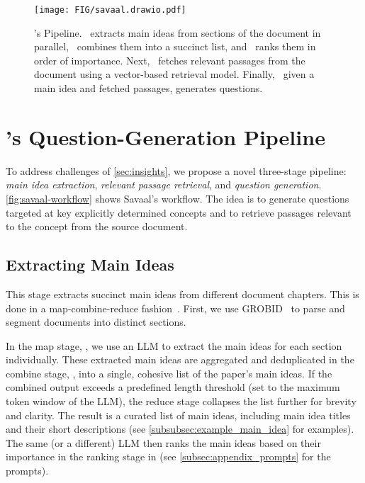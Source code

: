 \begin{figure*}[!t]
\centering
    \texttt{[image: FIG/savaal.drawio.pdf]}
    \caption{\name's Pipeline. \bluecircle\ \name extracts main ideas from sections of the document in parallel, \redcircle\ combines them into a succinct list, and \greencircle\ ranks them in order of importance. Next, \purplecircle\ \name fetches relevant passages from the document using a vector-based retrieval model. Finally, \orangecircle\ given a main idea and fetched passages, \name generates questions.}
    \label{fig:savaal-workflow}
\vspace{-10 pt}
\end{figure*}

\section{\name's Question-Generation Pipeline}
\label{sec:pipeline}


To address challenges of \autoref{sec:insights}, we propose a novel three-stage pipeline: \emph{main idea extraction}, \emph{relevant passage retrieval}, and \emph{question generation}. \autoref{fig:savaal-workflow} shows Savaal's workflow. The idea is to generate questions targeted at key explicitly determined concepts and to retrieve passages relevant to the concept from the source document.


\subsection{Extracting Main Ideas}
\label{sec:pipeline-main-idea}
This stage extracts succinct main ideas from different document chapters. This is done in a map-combine-reduce fashion~\cite{langchain_mapreduce}. First, we use GROBID~\citep{GROBID} to parse and segment documents into distinct sections.


In the map stage, , we use an LLM to extract the main ideas for each section individually. These extracted main ideas are aggregated and deduplicated in the combine stage, , into a single, cohesive list of the paper’s main ideas. If the combined output exceeds a predefined length threshold (set to the maximum token window of the LLM), the reduce stage collapses the list further for brevity and clarity. The result is a curated list of main ideas, including main idea titles and their short descriptions (see \autoref{subsubsec:example_main_idea} for examples). The same (or a different) LLM then ranks the main ideas based on their importance in the ranking stage in  (see \autoref{subsec:appendix_prompts} for the prompts).


